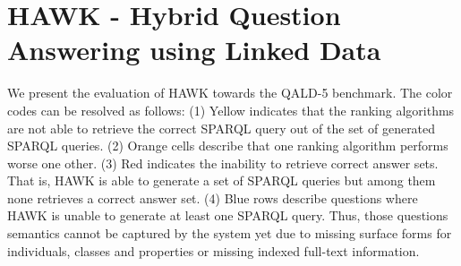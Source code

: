 \chapter{HAWK - Hybrid Question Answering using Linked Data}
\label{cha:app_hawk}


We present the evaluation of HAWK towards the \ac{QALD}-5 benchmark. The color codes can be resolved as follows:
(1) Yellow indicates that the ranking algorithms are not able to retrieve the correct SPARQL query out of the set of generated SPARQL queries. 
(2) Orange cells describe that one ranking algorithm performs worse one other.
(3) Red indicates the inability to retrieve correct answer sets.
That is, HAWK is able to generate a set of SPARQL queries but among them none retrieves a correct answer set.
(4) Blue rows describe questions where HAWK is unable to generate at least one SPARQL query. Thus, those questions semantics cannot be captured by the system yet due to missing surface forms for individuals, classes and properties or missing indexed full-text information.

{
\scriptsize

}

